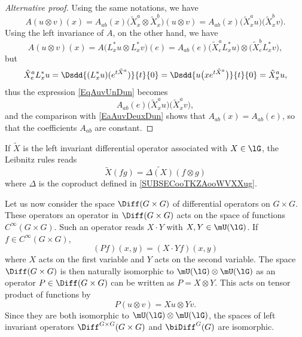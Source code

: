 \begin{proof}[Alternative proof]
	Using the same notations, we have
	\begin{equation}		\label{EaAuvDeuxDun}
		A(u\otimes v)(x)=A_{ab}(x)\big( \tilde X^a_x\otimes\tilde X^b_x \big)(u\otimes v)=A_{ab}(x)\big( \tilde X^a_xu \big)\big( \tilde X^b_xv \big).
	\end{equation}
	Using the left invariance of $A$, on the other hand, we have
	\begin{equation}		\label{EqAuvUnDun}
		A(u\otimes v)(x)=A\big( L^*_xu\otimes L^*_xv \big)(e)=A_{ab}(e)\big( \tilde X^a_eL^*_xu \big)\otimes\big( \tilde X^b_eL^*_xv \big),
	\end{equation}
	but
	\begin{equation}
		\tilde X^a_eL^*_xu=\Dsdd{ (L^*_xu)( e^{t\tilde X^a}) }{t}{0}=\Dsdd{ u\big( x e^{t\tilde X^a} \big) }{t}{0}=\tilde X^a_xu,
	\end{equation}
	thus the expression \eqref{EqAuvUnDun} becomes
	\begin{equation}
		A_{ab}(e)\big( \tilde X^a_xu \big)\big( \tilde X^a_xv \big),
	\end{equation}
	and the comparison with \eqref{EaAuvDeuxDun} shows that $A_{ab}(x)=A_{ab}(e)$, so that the coefficients $A_{ab}$ are constant.
\end{proof}

\begin{remark}  \label{REMooGIFYooTphiex}
    If $\tilde X$ is the left invariant differential operator associated with $X\in\lG$, the Leibnitz rules reads
    \begin{equation}		\label{EqXfgDeltaUnif}
        \tilde X(fg)=\widetilde{\Delta(X)}(f\otimes g)
    \end{equation}
    where \( \Delta\) is the coproduct defined in \ref{SUBSECooTKZAooWVXXug}.
\end{remark}

Let us now consider the space $\Diff(G\times G)$ of differential operators on $G\times G$. These operators an operator in $\Diff(G\times G)$ acts on the space of functions $ C^{\infty}(G\times G)$. Such an operator reads $X\cdot Y$ with $X,Y\in\mU(\lG)$. If $f\in C^{\infty}(G\times G)$,
\begin{equation}
	(Pf)(x,y)=(X\cdot Y f)(x,y)
\end{equation}
where $X$ acts on the first variable and $Y$ acts on the second variable. The space $\Diff(G\times G)$ is then naturally isomorphic to $\mU(\lG)\otimes \mU(\lG)$ as an operator $P\in\Diff(G\times G)$ can be written as $P=X\otimes Y$. This acts on tensor product of functions by
\begin{equation}
	P(u\otimes v)=Xu\otimes Yv.
\end{equation}
Since they are both isomorphic to $\mU(\lG)\otimes\mU(\lG)$, the spaces of left invariant operators $\Diff^{G\times G}(G\times G)$ and $\biDiff^G(G)$ are isomorphic.

